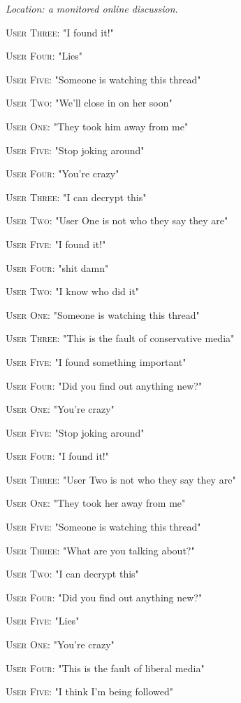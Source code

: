 \documentclass{report}
\begin{document}
\textit{Location: a monitored online discussion}. 

\textsc{User Three}: "I found it!" 

\textsc{User Four}: "Lies" 

\textsc{User Five}: "Someone is watching this thread" 

\textsc{User Two}: "We'll close in on her soon" 

\textsc{User One}: "They took him away from me" 

\textsc{User Five}: "Stop joking around" 

\textsc{User Four}: "You're crazy" 

\textsc{User Three}: "I can decrypt this" 

\textsc{User Two}: "User One is not who they say they are" 

\textsc{User Five}: "I found it!" 

\textsc{User Four}: "shit damn" 

\textsc{User Two}: "I know who did it" 

\textsc{User One}: "Someone is watching this thread" 

\textsc{User Three}: "This is the fault of conservative media" 

\textsc{User Five}: "I found something important" 

\textsc{User Four}: "Did you find out anything new?" 

\textsc{User One}: "You're crazy" 

\textsc{User Five}: "Stop joking around" 

\textsc{User Four}: "I found it!" 

\textsc{User Three}: "User Two is not who they say they are" 

\textsc{User One}: "They took her away from me" 

\textsc{User Five}: "Someone is watching this thread" 

\textsc{User Three}: "What are you talking about?" 

\textsc{User Two}: "I can decrypt this" 

\textsc{User Four}: "Did you find out anything new?" 

\textsc{User Five}: "Lies" 

\textsc{User One}: "You're crazy" 

\textsc{User Four}: "This is the fault of liberal media" 

\textsc{User Five}: "I think I'm being followed" 
\end{document}

